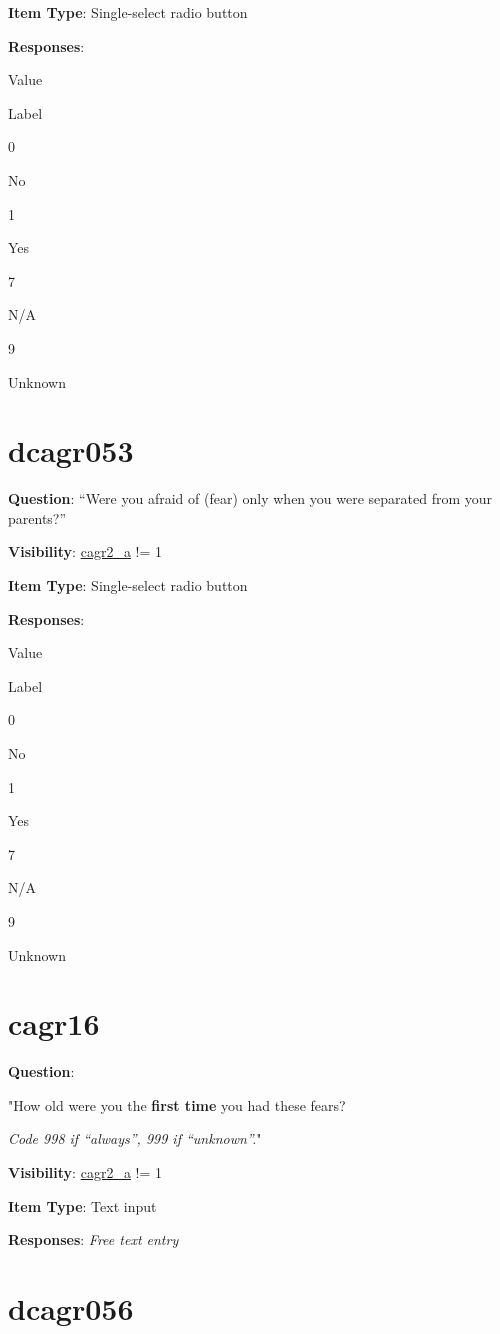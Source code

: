 \documentclass[]{book}
\begin{document}
\textbf{Item Type}: Single-select radio button

\textbf{Responses}:

Value

Label

0

No

1

Yes

7

N/A

9

Unknown

\hypertarget{dcagr053}{%
\section{dcagr053}\label{dcagr053}}

\textbf{Question}: ``Were you afraid of (fear) only when you were separated from your parents?''

\textbf{Visibility}: \protect\hyperlink{cagr2_a}{cagr2\_a} != 1

\textbf{Item Type}: Single-select radio button

\textbf{Responses}:

Value

Label

0

No

1

Yes

7

N/A

9

Unknown

\hypertarget{cagr16}{%
\section{cagr16}\label{cagr16}}

\textbf{Question}:

"How old were you the \textbf{first time} you had these fears?

\emph{Code 998 if ``always'', 999 if ``unknown''.}"

\textbf{Visibility}: \protect\hyperlink{cagr2_a}{cagr2\_a} != 1

\textbf{Item Type}: Text input

\textbf{Responses}: \emph{Free text entry}

\hypertarget{dcagr056}{%
\section{dcagr056}\label{dcagr056}}
\end{document}
